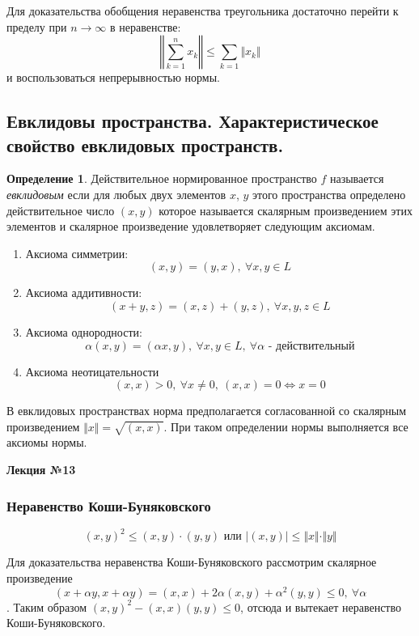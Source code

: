 \documentclass[14pt,a4paper]{extarticle}
\theoremstyle{definition}
\newtheorem{definition}{Определение}[section]
\theoremstyle{remark}
\renewcommand{\[}{\begin{dmath*}[compact]}
\renewcommand{\]}{\end{dmath*}}
\newcommand{\be}{\begin{enumerate}}
\newcommand{\ee}{\end{enumerate}}
\newcommand{\sep}{ , \ \allowbreak }
\begin{document}
Для доказательства обобщения неравенства треугольника достаточно перейти к
пределу при $n \to \infty$ в неравенстве:
\[ \left \Vert \sum_{k=1}^n x_k \right \Vert \leq \sum_{k=1} \Vert x_k \Vert \]
и воспользоваться непрерывностью нормы.

\subsection{Евклидовы пространства.
Характеристическое свойство евклидовых пространств.}

\begin{definition}
  Действительное нормированное пространство $f$ называется \textit{евклидовым}
  если для любых двух элементов $x$, $y$ этого пространства определено
  действительное число $(x,y)$ которое называется скалярным произведением
  этих элементов и скалярное произведение удовлетворяет следующим аксиомам.

  \be
    \item Аксиома симметрии:
    \[(x,y)=(y,x) \sep {\forall x,y \in L}\]

    \item Аксиома аддитивности:
    \[ (x + y, z) = (x,z) + (y,z) \sep {\forall x,y,z \in L} \]

    \item Аксиома однородности:
    \[\alpha (x,y) = (\alpha x,y) \sep {\forall x,y \in L} \sep
    {\forall \alpha \text{ - действительный}} \]

    \item Аксиома неотицательности
    \[ (x,x) > 0 \sep\forall x\neq 0 \sep {(x,x)=0 \Leftrightarrow x=0} \]
  \ee
\end{definition}

В евклидовых пространствах норма предполагается согласованной
со скалярным произведением $ \Vert x \Vert =\sqrt{(x,x)}$.
При таком определении нормы выполняется все аксиомы нормы.

\textbf{Лекция №13}

\subsubsection{Неравенство Коши-Буняковского}
\[ (x,y)^2 \leq (x,y) \cdot (y,y) \text{ или }
|(x,y)| \leq \Vert x \Vert \cdot \Vert y \Vert\]

Для доказательства неравенства Коши-Буняковского рассмотрим
скалярное произведение
\[(x + \alpha y, x+ \alpha y) = (x,x) + 2 \alpha (x,y) + \alpha^2 (y,y) \leq 0
\sep {\forall \alpha}\].
Таким образом $(x,y)^2 - (x,x)(y,y) \leq 0$,
отсюда и вытекает неравенство Коши-Буняковского.
\end{document}

